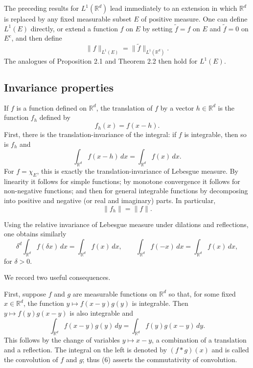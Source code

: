 \documentclass[11pt,openany]{book}
\begin{document}
The preceding results for $L^1(\mathbb{R}^d)$ lead immediately to an extension in which $\mathbb{R}^d$ is replaced by any fixed measurable subset $E$ of positive measure. One can define $L^1(E)$ directly, or extend a function $f$ on $E$ by setting $\widetilde f=f$ on $E$ and $\widetilde f=0$ on $E^c$, and then define
\[
\|f\|_{L^1(E)}=\|\widetilde f\|_{L^1(\mathbb{R}^d)}.
\]
The analogues of Proposition 2.1 and Theorem 2.2 then hold for $L^1(E)$.

\subsection*{Invariance properties}

If $f$ is a function defined on $\mathbb{R}^d$, the translation of $f$ by a vector $h\in\mathbb{R}^d$ is the function $f_h$ defined by
\[
f_h(x)=f(x-h).
\]
First, there is the translation-invariance of the integral: if $f$ is integrable, then so is $f_h$ and
\begin{equation}
\int_{\mathbb{R}^d}f(x-h)\,dx
=\int_{\mathbb{R}^d}f(x)\,dx.
\tag{4}
\end{equation}
For $f=\chi_E$, this is exactly the translation-invariance of Lebesgue measure. By linearity it follows for simple functions; by monotone convergence it follows for non-negative functions; and then for general integrable functions by decomposing into positive and negative (or real and imaginary) parts. In particular,
\[
\|f_h\|=\|f\|.
\]

Using the relative invariance of Lebesgue measure under dilations and reflections, one obtains similarly
\begin{equation}
\delta^d\int_{\mathbb{R}^d}f(\delta x)\,dx
=\int_{\mathbb{R}^d}f(x)\,dx,
\qquad
\int_{\mathbb{R}^d}f(-x)\,dx
=\int_{\mathbb{R}^d}f(x)\,dx,
\tag{5}
\end{equation}
for $\delta>0$.

We record two useful consequences.

First, suppose $f$ and $g$ are measurable functions on $\mathbb{R}^d$ so that, for some fixed $x\in\mathbb{R}^d$, the function $y\mapsto f(x-y)g(y)$ is integrable. Then $y\mapsto f(y)g(x-y)$ is also integrable and
\begin{equation}
\int_{\mathbb{R}^d}f(x-y)g(y)\,dy
=\int_{\mathbb{R}^d}f(y)g(x-y)\,dy.
\tag{6}
\end{equation}
This follows by the change of variables $y\mapsto x-y$, a combination of a translation and a reflection. The integral on the left is denoted by $(f*g)(x)$ and is called the convolution of $f$ and $g$; thus (6) asserts the commutativity of convolution.
\end{document}

